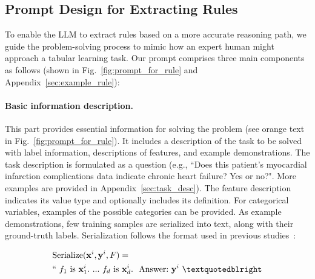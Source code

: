 \subsection{Prompt Design for Extracting Rules}
\label{Sec:prompt_design}
To enable the LLM to extract rules based on a more accurate reasoning path, we guide the problem-solving process to mimic how an expert human might approach a tabular learning task. Our prompt comprises three main components as follows (shown in  Fig.~\ref{fig:prompt_for_rule} and Appendix~\ref{sec:example_rule}):

\vspace*{-0.12in}
\paragraph{Basic information description.} This part provides essential information for solving the problem (see orange text in Fig.~\ref{fig:prompt_for_rule}). It includes a description of the task to be solved with label information, descriptions of features, and example demonstrations. The task description is formulated as a question (e.g., ``Does this patient's myocardial infarction complications data indicate chronic heart failure? Yes or no?". More examples are provided in Appendix~\ref{sec:task_desc}). The feature description indicates its value type and optionally includes its definition. For categorical variables, examples of the possible categories can be provided. As example demonstrations, few training samples are serialized into text, along with their ground-truth labels. Serialization follows the format used in previous studies~\cite{dinh2022lift,hegselmann2023tabllm}:

\begin{align}
&\text{Serialize}(\mathbf{x}^i,\mathbf{y}^i, F) = \nonumber \\ 
&``\ f_1\ \text{is}\ \mathbf{x}^i_1.\ ... \ f_d\  \text{is}\  \mathbf{x}^i_d.\ \ \text{Answer:}\  \mathbf{y}^i\ ”
\end{align}

\vspace*{-0.12in}
